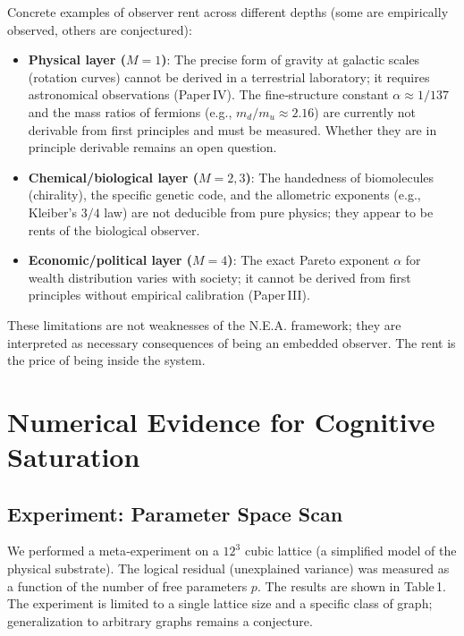 \documentclass[12pt,a4paper]{article}
\begin{document}
Concrete examples of observer rent across different depths (some are empirically observed, others are conjectured):
\begin{itemize}
    \item \textbf{Physical layer (\(M=1\))}: The precise form of gravity at galactic scales (rotation curves) cannot be derived in a terrestrial laboratory; it requires astronomical observations (Paper IV). The fine‑structure constant \(\alpha \approx 1/137\) and the mass ratios of fermions (e.g., \(m_d/m_u \approx 2.16\)) are currently not derivable from first principles and must be measured. Whether they are in principle derivable remains an open question.
    \item \textbf{Chemical/biological layer (\(M=2,3\))}: The handedness of biomolecules (chirality), the specific genetic code, and the allometric exponents (e.g., Kleiber’s \(3/4\) law) are not deducible from pure physics; they appear to be rents of the biological observer.
    \item \textbf{Economic/political layer (\(M=4\))}: The exact Pareto exponent \(\alpha\) for wealth distribution varies with society; it cannot be derived from first principles without empirical calibration (Paper III).
\end{itemize}
These limitations are not weaknesses of the N.E.A. framework; they are interpreted as necessary consequences of being an embedded observer. The rent is the price of being inside the system.

\section{Numerical Evidence for Cognitive Saturation}

\subsection{Experiment: Parameter Space Scan}

We performed a meta‑experiment on a \(12^3\) cubic lattice (a simplified model of the physical substrate). The logical residual (unexplained variance) was measured as a function of the number of free parameters \(p\). The results are shown in Table 1. The experiment is limited to a single lattice size and a specific class of graph; generalization to arbitrary graphs remains a conjecture.
\end{document}
